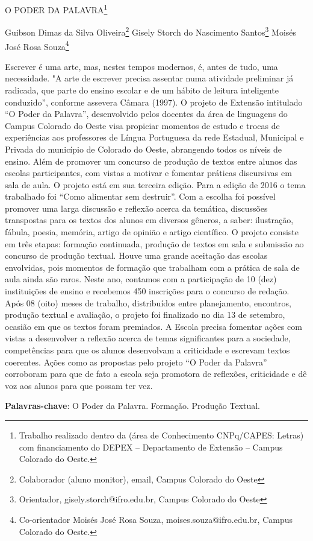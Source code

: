 \documentclass[article,12pt,onesidea,4paper,english,brazil]{abntex2}
\begin{document}
	
	
	\frenchspacing 
	
	\begin{center}
		\LARGE O PODER DA PALAVRA\footnote{Trabalho realizado dentro da (área de Conhecimento CNPq/CAPES: Letras) com financiamento do DEPEX – Departamento de Extensão – Campus Colorado do Oeste.}
		
		\normalsize
		Guibson Dimas da Silva Oliveira\footnote{Colaborador (aluno monitor), email, Campus Colorado do Oeste} 
		Gisely Storch do Nascimento Santos\footnote{Orientador, gisely.storch@ifro.edu.br, Campus Colorado do Oeste} 
		Moisés José Rosa Souza\footnote{Co-orientador Moisés José Rosa Souza, moises.souza@ifro.edu.br, Campus Colorado do Oeste.} 
	
	\end{center}
	
	\noindent Escrever é uma arte, mas, nestes tempos modernos, é, antes de tudo, uma necessidade. "A arte de escrever precisa assentar numa atividade preliminar já radicada, que parte do ensino escolar e de um hábito de leitura inteligente conduzido”, conforme assevera Câmara (1997). O projeto de Extensão intitulado “O Poder da Palavra”, desenvolvido pelos docentes da área de linguagens do Campus Colorado do Oeste visa propiciar momentos de estudo e trocas de experiências aos professores de Língua Portuguesa da rede Estadual, Municipal e Privada do município de Colorado do Oeste, abrangendo todos os níveis de ensino. Além de promover um concurso de produção de textos entre alunos das escolas participantes, com vistas a motivar e fomentar práticas discursivas em sala de aula. O projeto está em sua terceira edição. Para a edição de 2016 o tema trabalhado foi “Como alimentar sem destruir”. Com a escolha foi possível promover uma larga discussão e reflexão acerca da temática, discussões transpostas para os textos dos alunos em diversos gêneros, a saber: ilustração, fábula, poesia, memória, artigo de opinião e artigo científico. O projeto consiste em três etapas: formação continuada, produção de textos em sala e submissão ao concurso de produção textual. Houve uma grande aceitação das escolas envolvidas, pois momentos de formação que trabalham com a prática de sala de aula ainda são raros. Neste ano, contamos com a participação de 10 (dez) instituições de ensino e recebemos 450 inscrições para o concurso de redação. Após 08 (oito) meses de trabalho, distribuídos entre planejamento, encontros, produção textual e avaliação, o projeto foi finalizado no dia 13 de setembro, ocasião em que os textos foram premiados. A Escola precisa fomentar ações com vistas a desenvolver a reflexão acerca de temas significantes para a sociedade, competências para que os alunos desenvolvam a criticidade e escrevam textos coerentes. Ações como as propostas pelo projeto “O Poder da Palavra” corroboram para que de fato a escola seja promotora de reflexões, criticidade e dê voz aos alunos para que possam ter vez.
	
	\vspace{\onelineskip}
	
	\noindent
	\textbf{Palavras-chave}: O Poder da Palavra. Formação. Produção Textual.
	
\end{document}
